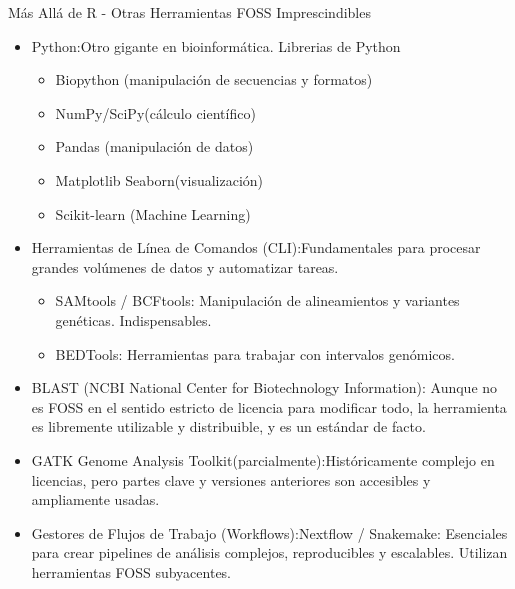 \documentclass[11pt]{beamer}
\begin{document}

	\begin{frame}{Más Allá de R - Otras Herramientas FOSS Imprescindibles}

 		\begin{itemize}
 			\item Python:Otro gigante en bioinformática. Librerias de Python
					\begin{itemize}
					\item Biopython (manipulación de secuencias y formatos)
					\item NumPy/SciPy(cálculo científico)
					\item Pandas (manipulación de datos)
					\item Matplotlib Seaborn(visualización)
					\item Scikit-learn (Machine Learning)
					\end{itemize}
			\item Herramientas de Línea de Comandos (CLI):Fundamentales para procesar grandes volúmenes de datos y automatizar tareas.
 			
					\begin{itemize}
					\item SAMtools / BCFtools: Manipulación de alineamientos y variantes genéticas. Indispensables.
					\item BEDTools: Herramientas para trabajar con intervalos genómicos.
					\end{itemize}
		\end{itemize}	
 	\end{frame}
 	

	\begin{frame}
 		\begin{itemize}	
			\item BLAST (NCBI National Center for Biotechnology Information): Aunque no es FOSS en el sentido estricto de licencia para modificar todo, la herramienta es libremente utilizable y distribuible, y es un estándar de facto.
			\item GATK Genome Analysis Toolkit(parcialmente):Históricamente complejo en licencias, pero partes clave y versiones anteriores son accesibles y ampliamente usadas.
			\item Gestores de Flujos de Trabajo (Workflows):Nextflow / Snakemake: Esenciales para crear pipelines de análisis complejos, reproducibles y escalables. Utilizan herramientas FOSS subyacentes.
 		\end{itemize}
	\end{frame}
	
\end{document}
